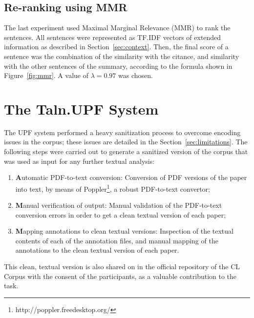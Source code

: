 \documentclass[11pt]{article}
\begin{document}
\subsection{Re-ranking using MMR}
\label{sec:mmr}
The last experiment used Maximal Marginal Relevance (MMR) \cite{Carbonell:1998} to rank the sentences. All sentences were represented as TF.IDF vectors of extended information as described in Section~\ref{sec:context}. Then, the final score of a sentence was the combination of the similarity with the citance, and similarity with the other sentences of the summary, according to the formula shown in Figure~\ref{fig:mmr}. A value of $\lambda=0.97$ was chosen.

\section{The Taln.UPF System}

The UPF system performed a heavy sanitization process to overcome encoding issues in the corpus; these issues are detailed in the Section~\ref{sec:limitations}. The following steps were carried out to generate a sanitized version of the corpus that was used as input for any further textual analysis:
\begin{enumerate}
\vspace{-.3cm}
\item {\textbf Automatic PDF-to-text conversion}: Conversion of PDF versions of the paper into text, by means of Poppler\footnote{http://poppler.freedesktop.org/}, a robust PDF-to-text convertor;
\vspace{-.3cm}
\item {\textbf Manual verification of output}: Manual validation of the PDF-to-text conversion errors in order to get a clean textual version of each paper;
\vspace{-.3cm}
\item {\textbf Mapping annotations to clean textual versions}: Inspection of the textual contents of each of the annotation files, and manual mapping of the annotations to the clean textual version of each paper.
\vspace{-.3cm}
\end{enumerate}
This clean, textual version is also shared on in the official repository of the CL Corpus with the consent of the participants, as a valuable contribution to the task.
\end{document}
